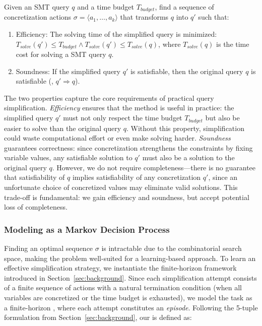 \begin{problem}
\label{problem:optimal-simplification}
Given an SMT query $q$ and a time budget $T_{budget}$, find a sequence of concretization actions $\sigma = \langle a_1, \dots, a_k \rangle$ that transforms $q$ into $q'$ such that:
\begin{enumerate}
    \item Efficiency: The solving time of the simplified query is minimized: $T_{solve}(q') \le T_{budget} \land T_{solve}(q') \le T_{solve}(q)$, where $T_{solve}(q)$ is the time cost for solving a SMT query $q$.
    \item Soundness: If the simplified query $q'$ is satisfiable, then the original query $q$ is satisfiable (\ie, $q' \Rightarrow q$). 
\end{enumerate}
\end{problem}
\noindent The two properties capture the core requirements of practical query simplification. 
\emph{Efficiency} ensures that the method is useful in practice: the simplified query $q'$ must not only respect the time budget $T_{budget}$ but also be easier to solve than the original query $q$. Without this property, simplification could waste computational effort or even make solving harder. 
\emph{Soundness} guarantees correctness: since concretization strengthens the constraints by fixing variable values, any satisfiable solution to $q'$ must also be a solution to the original query $q$. 
However, we do not require completeness—there is no guarantee that satisfiability of $q$ implies satisfiability of any concretization $q'$, since an unfortunate choice of concretized values may eliminate valid solutions. This trade-off is fundamental: we gain efficiency and soundness, but accept potential loss of completeness.

\subsubsection{Modeling as a Markov Decision Process}
Finding an optimal sequence $\sigma$ is intractable due to the combinatorial search space, making the problem well-suited for a learning-based approach. To learn an effective simplification strategy, we instantiate the finite-horizon \MDP{} framework introduced in Section~\ref{sec:background}. Since each simplification attempt consists of a finite sequence of actions with a natural termination condition (when all variables are concretized or the time budget is exhausted), we model the task as a finite-horizon \MDP{}, where each attempt constitutes an \textit{episode}. Following the 5-tuple formulation from Section~\ref{sec:background}, our \MDP{} is defined as:

